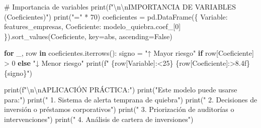 \documentclass[
  doc,
  floatsintext,
  longtable,
  a4paper,
  nolmodern,
  notxfonts,
  notimes,
  12pt,
  colorlinks=true,linkcolor=blue,citecolor=blue,urlcolor=blue]{apa7}
\newenvironment{Shaded}{\begin{snugshade}}{\end{snugshade}}
\newcommand{\BuiltInTok}[1]{\textcolor[rgb]{0.00,0.23,0.31}{#1}}
\newcommand{\CharTok}[1]{\textcolor[rgb]{0.13,0.47,0.30}{#1}}
\newcommand{\CommentTok}[1]{\textcolor[rgb]{0.37,0.37,0.37}{#1}}
\newcommand{\ControlFlowTok}[1]{\textcolor[rgb]{0.00,0.23,0.31}{\textbf{#1}}}
\newcommand{\DecValTok}[1]{\textcolor[rgb]{0.68,0.00,0.00}{#1}}
\newcommand{\KeywordTok}[1]{\textcolor[rgb]{0.00,0.23,0.31}{\textbf{#1}}}
\newcommand{\NormalTok}[1]{\textcolor[rgb]{0.00,0.23,0.31}{#1}}
\newcommand{\OperatorTok}[1]{\textcolor[rgb]{0.37,0.37,0.37}{#1}}
\newcommand{\SpecialCharTok}[1]{\textcolor[rgb]{0.37,0.37,0.37}{#1}}
\newcommand{\SpecialStringTok}[1]{\textcolor[rgb]{0.13,0.47,0.30}{#1}}
\newcommand{\StringTok}[1]{\textcolor[rgb]{0.13,0.47,0.30}{#1}}
\newcommand{\VariableTok}[1]{\textcolor[rgb]{0.07,0.07,0.07}{#1}}
\begin{document}
\begin{Shaded}
\begin{Highlighting}[]
\CommentTok{\# Importancia de variables}
\BuiltInTok{print}\NormalTok{(}\SpecialStringTok{f"}\CharTok{\textbackslash{}n\textbackslash{}n}\SpecialStringTok{IMPORTANCIA DE VARIABLES (Coeficientes)"}\NormalTok{)}
\BuiltInTok{print}\NormalTok{(}\StringTok{"="} \OperatorTok{*} \DecValTok{70}\NormalTok{)}
\NormalTok{coeficientes }\OperatorTok{=}\NormalTok{ pd.DataFrame(\{}
    \StringTok{\textquotesingle{}Variable\textquotesingle{}}\NormalTok{: features\_empresas,}
    \StringTok{\textquotesingle{}Coeficiente\textquotesingle{}}\NormalTok{: modelo\_quiebra.coef\_[}\DecValTok{0}\NormalTok{]}
\NormalTok{\}).sort\_values(}\StringTok{\textquotesingle{}Coeficiente\textquotesingle{}}\NormalTok{, key}\OperatorTok{=}\BuiltInTok{abs}\NormalTok{, ascending}\OperatorTok{=}\VariableTok{False}\NormalTok{)}

\ControlFlowTok{for}\NormalTok{ \_, row }\KeywordTok{in}\NormalTok{ coeficientes.iterrows():}
\NormalTok{    signo }\OperatorTok{=} \StringTok{"↑ Mayor riesgo"} \ControlFlowTok{if}\NormalTok{ row[}\StringTok{\textquotesingle{}Coeficiente\textquotesingle{}}\NormalTok{] }\OperatorTok{\textgreater{}} \DecValTok{0} \ControlFlowTok{else} \StringTok{"↓ Menor riesgo"}
    \BuiltInTok{print}\NormalTok{(}\SpecialStringTok{f"  }\SpecialCharTok{\{}\NormalTok{row[}\StringTok{\textquotesingle{}Variable\textquotesingle{}}\NormalTok{]}\SpecialCharTok{:\textless{}25\}}\SpecialStringTok{ }\SpecialCharTok{\{}\NormalTok{row[}\StringTok{\textquotesingle{}Coeficiente\textquotesingle{}}\NormalTok{]}\SpecialCharTok{:\textgreater{}8.4f\}}\SpecialStringTok{  }\SpecialCharTok{\{}\NormalTok{signo}\SpecialCharTok{\}}\SpecialStringTok{"}\NormalTok{)}

\BuiltInTok{print}\NormalTok{(}\SpecialStringTok{f"}\CharTok{\textbackslash{}n\textbackslash{}n}\SpecialStringTok{APLICACIÓN PRÁCTICA:"}\NormalTok{)}
\BuiltInTok{print}\NormalTok{(}\StringTok{"Este modelo puede usarse para:"}\NormalTok{)}
\BuiltInTok{print}\NormalTok{(}\StringTok{"  1. Sistema de alerta temprana de quiebra"}\NormalTok{)}
\BuiltInTok{print}\NormalTok{(}\StringTok{"  2. Decisiones de inversión o préstamos corporativos"}\NormalTok{)}
\BuiltInTok{print}\NormalTok{(}\StringTok{"  3. Priorización de auditorías o intervenciones"}\NormalTok{)}
\BuiltInTok{print}\NormalTok{(}\StringTok{"  4. Análisis de cartera de inversiones"}\NormalTok{)}
\end{Highlighting}
\end{Shaded}
\end{document}
